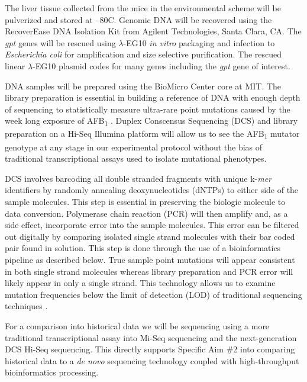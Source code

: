 \documentclass[12pt]{article}
\let\cite\shortcite %
\begin{document}
The liver tissue collected from the mice in the environmental scheme will be pulverized and stored at --80\degree{}C.
Genomic DNA will be recovered using the RecoverEase DNA Isolation Kit from Agilent Technologies, Santa Clara, CA.
The \emph{gpt} genes will be rescued using $\lambda$-EG10 \emph{in vitro} packaging and infection to \emph{Escherichia coli} for amplification and size selective purification.
The rescued linear $\lambda$-EG10 plasmid codes for many genes including the \emph{gpt} gene of interest.

\vspace{4mm}
DNA samples will be prepared using the BioMicro Center core at MIT.
The library preparation is essential in building a reference of DNA with enough depth of sequencing to statistically measure ultra-rare point mutations caused by the week long exposure of AFB\textsubscript{1} \cite{Schmitt2012}.
Duplex Conscensus Sequencing (DCS) and library preparation on a Hi-Seq Illumina platform will allow us to see the AFB\textsubscript{1} mutator genotype at any stage in our experimental protocol without the bias of traditional transcriptional assays used to isolate mutational phenotypes.

DCS involves barcoding all double stranded fragments with unique k-\emph{mer} identifiers by randomly annealing deoxynucleotides (dNTPs) to either side of the sample molecules.
This step is essential in preserving the biologic molecule to data conversion. Polymerase chain reaction (PCR) will then amplify and, as a side effect, incorporate error into the sample molecules.
This error can be filtered out digitally by comparing isolated single strand molecules with their bar coded pair found in solution.
This step is done through the use of a bioinformatics pipeline as described below.
True sample point mutations will appear consistent in both single strand molecules whereas library preparation and PCR error will likely appear in only a single strand.
This technology allows us to examine mutation frequencies below the limit of detection (LOD) of traditional sequencing techniques \cite{Kennedy2013a}.

For a comparison into historical data we will be sequencing using a more traditional transcriptional assay into Mi-Seq sequencing and the next-generation DCS Hi-Seq sequencing.
This directly supports Specific Aim \#2 into comparing historical data to a \emph{de novo} sequencing technology coupled with high-throughput bioinformatics processing.
\end{document}
